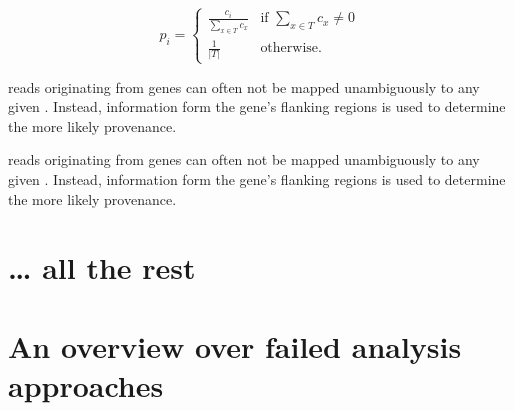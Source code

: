 \begin{equation}
    p_i = \begin{cases}
        \frac{c_i}{\sum_{x \in T}c_x} & \text{if } \sum_{x \in T}c_x \neq 0 \\
        \frac{1}{\vert T \rvert} & \text{otherwise.}
    \end{cases}
\end{equation}

    {\chip reads originating from \trna genes can often not be mapped
    unambiguously to any given \trna. Instead, information form the gene’s
    flanking regions is used to determine the more likely provenance.}

    {\chip reads originating from \trna genes can often not be mapped
    unambiguously to any given \trna. Instead, information form the gene’s
    flanking regions is used to determine the more likely provenance.}

\section{… all the rest}

\section{An overview over failed analysis approaches}
